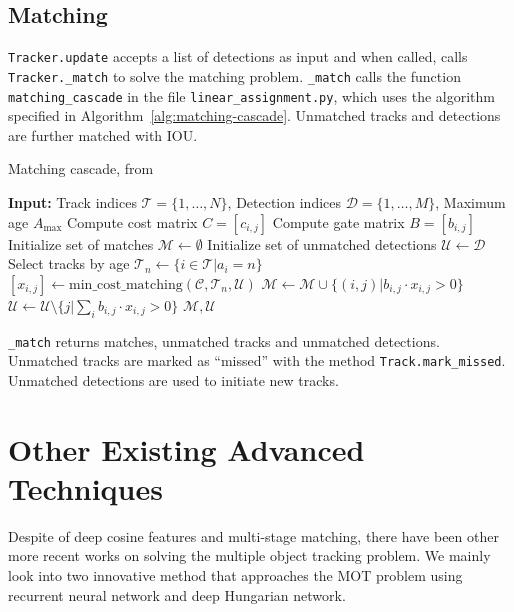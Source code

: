 \documentclass[conference]{IEEEtran}
\begin{document}
\subsection{Matching}

\texttt{Tracker.update} accepts a list of detections as input and when called, calls \texttt{Tracker.\_match} to solve the matching problem. \texttt{\_match} calls the function \texttt{matching\_cascade} in the file \texttt{linear\_assignment.py}, which uses the algorithm specified in Algorithm~\ref{alg:matching-cascade}. Unmatched tracks and detections are further matched with IOU.

\begin{algorithm}[t]
    \caption{Matching cascade, from \cite{Wojke2018deep}}
    \label{alg:matching-cascade}
    \begin{algorithmic}[1]
        \Statex \textbf{Input:} Track indices $\mathcal{T} = \{1, \dots, N\}$, Detection indices $\mathcal{D} = \{1, \dots, M\}$, Maximum age $A_\textrm{max}$
        \State Compute cost matrix $C = [c_{i,j}]$
        \State Compute gate matrix $B = [b_{i,j}]$
        \State Initialize set of matches $\mathcal{M} \gets \emptyset$
        \State Initialize set of unmatched detections $\mathcal{U} \gets \mathcal{D}$
            \State Select tracks by age $\mathcal{T}_n \gets \{i \in \mathcal{T} | a_i = n\}$
            \State $[x_{i,j}] \gets \mathrm{min\_cost\_matching}(\mathcal{C}, \mathcal{T}_n, \mathcal{U})$
            \State $\mathcal{M} \gets \mathcal{M} \cup \{(i, j) | b_{i,j} \cdot x_{i,j} > 0\}$
            \State $\mathcal{U} \gets \mathcal{U} \setminus \{j | \sum_i b_{i,j} \cdot x_{i,j} > 0\}$
        \EndFor
        \State \Return $\mathcal{M}, \mathcal{U}$
    \end{algorithmic}
\end{algorithm}

\texttt{\_match} returns matches, unmatched tracks and unmatched detections. Unmatched tracks are marked as ``missed'' with the method \texttt{Track.mark\_missed}. Unmatched detections are used to initiate new tracks.

\section{Other Existing Advanced Techniques}
Despite of deep cosine features and multi-stage matching, there have been other more recent works on solving the multiple object tracking problem.
We mainly look into two innovative method that approaches the MOT problem using recurrent neural network and deep Hungarian network.
\end{document}
